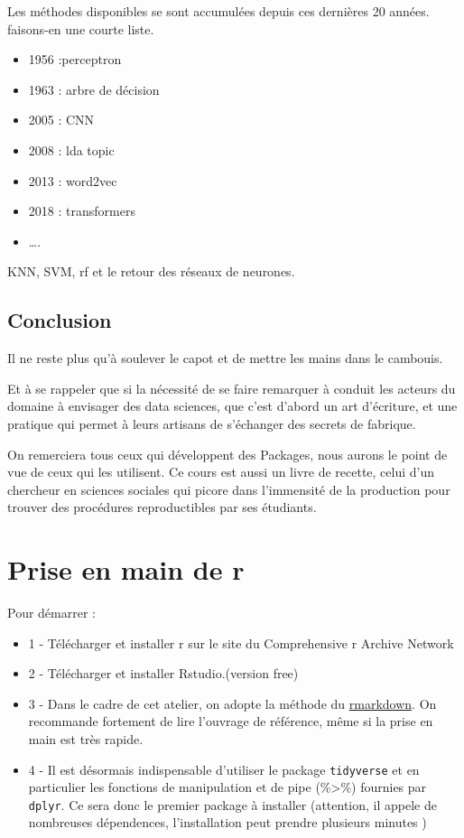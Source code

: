 \documentclass[
]{book}
\providecommand{\tightlist}{%
  \setlength{\itemsep}{0pt}\setlength{\parskip}{0pt}}
\begin{document}
Les méthodes disponibles se sont accumulées depuis ces dernières 20 années. faisons-en une courte liste.

\begin{itemize}
\tightlist
\item
  1956 :perceptron
\item
  1963 : arbre de décision
\item
  2005 : CNN
\item
  2008 : lda topic
\item
  2013 : word2vec
\item
  2018 : transformers
\item
  \ldots.
\end{itemize}

KNN, SVM, rf et le retour des réseaux de neurones.

\hypertarget{conclusion}{%
\section{Conclusion}\label{conclusion}}

Il ne reste plus qu'à soulever le capot et de mettre les mains dans le cambouis.

Et à se rappeler que si la nécessité de se faire remarquer à conduit les acteurs du domaine à envisager des data sciences, que c'est d'abord un art d'écriture, et une pratique qui permet à leurs artisans de s'échanger des secrets de fabrique.

On remerciera tous ceux qui développent des Packages, nous aurons le point de vue de ceux qui les utilisent. Ce cours est aussi un livre de recette, celui d'un chercheur en sciences sociales qui picore dans l'immensité de la production pour trouver des procédures reproductibles par ses étudiants.

\hypertarget{prise-en-main-de-r}{%
\chapter{Prise en main de r}\label{prise-en-main-de-r}}

Pour démarrer :

\begin{itemize}
\tightlist
\item
  1 - Télécharger et installer r sur le site du Comprehensive r Archive Network
\item
  2 - Télécharger et installer Rstudio.(version free)
\item
  3 - Dans le cadre de cet atelier, on adopte la méthode du \href{https://rmarkdown.rstudio.com/lesson-1.html}{rmarkdown}. On recommande fortement de lire l'ouvrage de référence, même si la prise en main est très rapide.
\item
  4 - Il est désormais indispensable d'utiliser le package \texttt{tidyverse} et en particulier les fonctions de manipulation et de pipe (\%\textgreater\%) fournies par \texttt{dplyr}. Ce sera donc le premier package à installer (attention, il appele de nombreuses dépendences, l'installation peut prendre plusieurs minutes )
\end{itemize}
\end{document}

